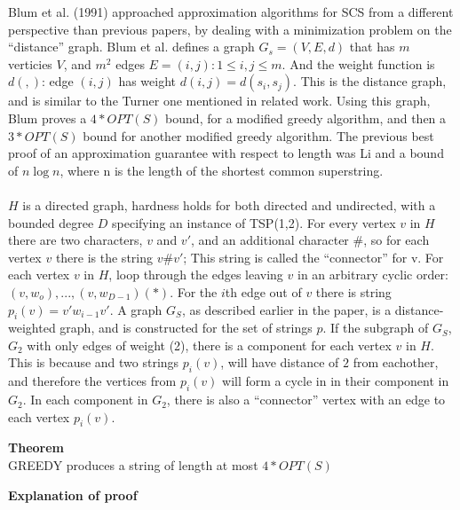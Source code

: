 \documentclass[letterpaper,11pt,titlepage]{article}
\begin{document}
Blum et al. (1991) approached approximation algorithms for SCS from a different perspective than previous papers, by dealing with a minimization problem on the ``distance'' graph.  Blum et al. defines a graph $G_s = (V, E, d)$ that has $m$ verticies $V$, and $m^2$ edges $E = {(i,j): 1 \leq i, j \leq m}$.  And the weight function is $d(,)$: edge $(i,j)$ has weight $d(i,j) = d(s_i, s_j)$.  This is the distance graph, and is similar to the Turner one mentioned in related work.  Using this graph, Blum proves a $4*OPT(S)$ bound, for a modified greedy algorithm, and then a $3*OPT(S)$ bound for another modified greedy algorithm.  The previous best proof of an approximation guarantee with respect to length was Li and a bound of $n\log n$, where n is the length of the shortest common superstring.  \\ \\

$H$ is a directed graph, hardness holds for both directed and undirected, with a bounded degree $D$ specifying an instance of TSP(1,2).  For every vertex $v$ in $H$ there are two characters, $v$ and $v'$, and an additional character $\#$, so for each vertex $v$ there is the string $v\#v'$; This string is called the ``connector'' for v.  For each vertex $v$ in $H$, loop through the edges leaving $v$ in an arbitrary cyclic order: $(v, w_o),...,(v,w_{D-1})(*)$.  For the $i$th edge out of $v$ there is string $p_i(v) = v'w_{i-1}v'$.  A graph $G_S$, as described earlier in the paper, is a distance-weighted graph, and is constructed for the set of strings $p$.  If the subgraph of $G_S$, $G_2$ with only edges of weight (2), there is a component for each vertex $v$ in $H$.  This is because and two strings $p_i(v)$, will have distance of $2$ from eachother, and therefore the vertices from $p_i(v)$ will form a cycle in in their component in $G_2$.  In each component in $G_2$, there is also a ``connector'' vertex with an edge to each vertex $p_i(v)$.  




\textbf{Theorem}\\
GREEDY produces a string of length at most $4 * OPT(S)$

\textbf{Explanation of proof}
\end{document}
